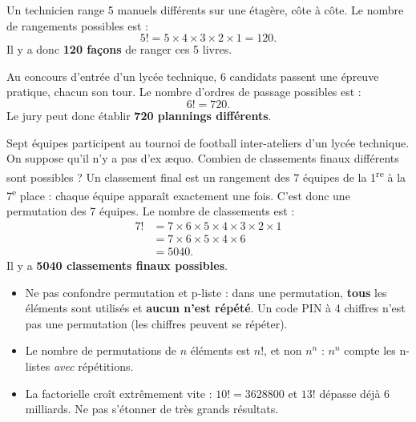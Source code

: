 \documentclass[11pt]{article}
\newcommand{\cle}[1]{{\popxbold\color{popdark}#1}}
\newcounter{popsec}
\newcounter{popsub}
\newcommand{\courssub}[1]{%
  \stepcounter{popsub}%
  \par\vspace{9pt}\noindent{\popxbold\fontsize{11.5}{13}\selectfont\color{popink}{\color{poporange}\thepopsec.\thepopsub}\hspace{6pt}#1}\par\nopagebreak\vspace{4pt}
}
\begin{document}
\courssub{Exemples concrets}

\begin{exemplebox}
Un technicien range 5 manuels différents sur une étagère, côte à côte. Le nombre de rangements possibles est :
\[ 5! = 5 \times 4 \times 3 \times 2 \times 1 = 120. \]
Il y a donc \textbf{120 façons} de ranger ces 5 livres.
\end{exemplebox}

\begin{exemplebox}
Au concours d'entrée d'un lycée technique, 6 candidats passent une épreuve pratique, chacun son tour. Le nombre d'ordres de passage possibles est :
\[ 6! = 720. \]
Le jury peut donc établir \textbf{720 plannings différents}.
\end{exemplebox}

\begin{exoresolu}
Sept équipes participent au tournoi de football inter-ateliers d'un lycée technique. On suppose qu'il n'y a pas d'ex æquo. Combien de classements finaux différents sont possibles ?
\tcblower
Un classement final est un rangement des 7 équipes de la 1\textsuperscript{re} à la 7\textsuperscript{e} place : chaque équipe apparaît exactement une fois. C'est donc une \cle{permutation} des 7 équipes. Le nombre de classements est :
\begin{align*}
7! &= 7 \times 6 \times 5 \times 4 \times 3 \times 2 \times 1 \\
&= 7 \times 6 \times 5 \times 4 \times 6 \\
&= 5040.
\end{align*}
Il y a \textbf{5040 classements finaux possibles}.
\end{exoresolu}

\begin{attention}
\begin{itemize}
\item Ne pas confondre permutation et p-liste : dans une permutation, \textbf{tous} les éléments sont utilisés et \textbf{aucun n'est répété}. Un code PIN à 4 chiffres n'est pas une permutation (les chiffres peuvent se répéter).
\item Le nombre de permutations de $n$ éléments est $n!$, et non $n^n$ : $n^n$ compte les n-listes \emph{avec} répétitions.
\item La factorielle croît extrêmement vite : $10! = \num{3628800}$ et $13!$ dépasse déjà 6 milliards. Ne pas s'étonner de très grands résultats.
\end{itemize}
\end{attention}
\end{document}
